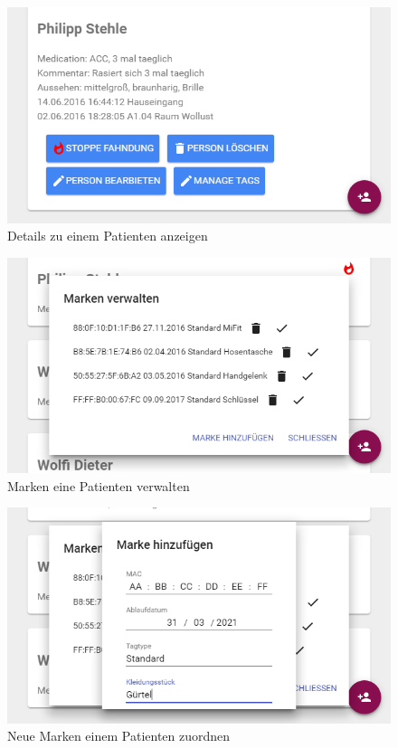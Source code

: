 \begin{figure}
	\centering
	\includegraphics[width=1.0\linewidth]{images/ui/persondetails}
	\caption{Details zu einem Patienten anzeigen}
	\label{img:ui/persondetails}
\end{figure}

\begin{figure}
	\centering
	\includegraphics[width=1.0\linewidth]{images/ui/markenverwalten}
	\caption{Marken eine Patienten verwalten}
	\label{img:ui/markenverwalten}
\end{figure}

\begin{figure}
	\centering
	\includegraphics[width=1.0\linewidth]{images/ui/markehinzufuegen}
	\caption{Neue Marken einem Patienten zuordnen}
	\label{img:ui/markehinzufuegen}
\end{figure}

